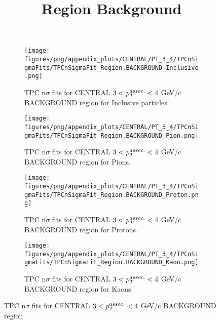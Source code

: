             \begin{figure}[H]
                \title{Region Background}
                \begin{subfigure}[b]{0.5\textwidth}
                    \centering
                    \texttt{[image: figures/png/appendix\_plots/CENTRAL/PT\_3\_4/TPCnSigmaFits/TPCnSigmaFit\_Region.BACKGROUND\_Inclusive.png]}
                    \caption{TPC n$\sigma$ fits for CENTRAL $3 < \pTassoc < 4$ GeV/c BACKGROUND region for Inclusive particles.}
                    \label{fig:appendix_CENTRAL_$3 < \pTassoc < 4$ GeV/c_BACKGROUND_Inclusive}
                \end{subfigure}
                \begin{subfigure}[b]{0.5\textwidth}
                    \centering
                    \texttt{[image: figures/png/appendix\_plots/CENTRAL/PT\_3\_4/TPCnSigmaFits/TPCnSigmaFit\_Region.BACKGROUND\_Pion.png]}
                    \caption{TPC n$\sigma$ fits for CENTRAL $3 < \pTassoc < 4$ GeV/c BACKGROUND region for Pions.}
                    \label{fig:appendix_CENTRAL_$3 < \pTassoc < 4$ GeV/c_BACKGROUND_Pion}
                \end{subfigure}
                \begin{subfigure}[b]{0.5\textwidth}
                    \centering
                    \texttt{[image: figures/png/appendix\_plots/CENTRAL/PT\_3\_4/TPCnSigmaFits/TPCnSigmaFit\_Region.BACKGROUND\_Proton.png]}
                    \caption{TPC n$\sigma$ fits for CENTRAL $3 < \pTassoc < 4$ GeV/c BACKGROUND region for Protons.}
                    \label{fig:appendix_CENTRAL_$3 < \pTassoc < 4$ GeV/c_BACKGROUND_Proton}
                \end{subfigure}
                \begin{subfigure}[b]{0.5\textwidth}
                    \centering
                    \texttt{[image: figures/png/appendix\_plots/CENTRAL/PT\_3\_4/TPCnSigmaFits/TPCnSigmaFit\_Region.BACKGROUND\_Kaon.png]}
                    \caption{TPC n$\sigma$ fits for CENTRAL $3 < \pTassoc < 4$ GeV/c BACKGROUND region for Kaons.}
                    \label{fig:appendix_CENTRAL_$3 < \pTassoc < 4$ GeV/c_BACKGROUND_Kaon}
                \end{subfigure}
                \caption{TPC n$\sigma$ fits for CENTRAL $3 < \pTassoc < 4$ GeV/c BACKGROUND region.}
                \label{fig:appendix_CENTRAL_$3 < \pTassoc < 4$ GeV/c_BACKGROUND}
            \end{figure}
            \clearpage
            
